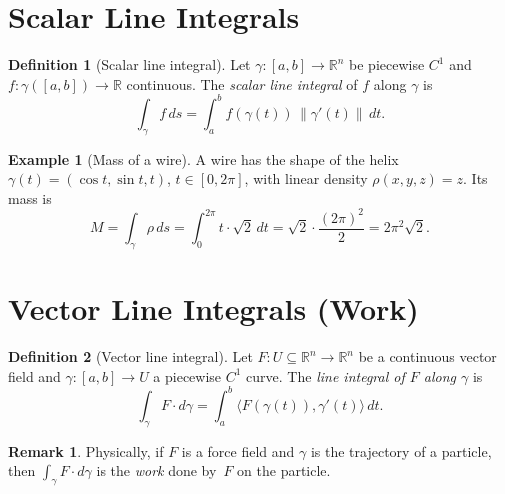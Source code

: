 \documentclass[12pt,a4paper]{book}
\theoremstyle{definition}
\newtheorem{definition}{Definition}[chapter]
\newtheorem{remark}{Remark}[chapter]
\newtheorem{example}{Example}[chapter]
\begin{document}
\section{Scalar Line Integrals}
\label{sec:scalar-line-integral}

\begin{definition}[Scalar line integral]\label{def:scalar-line-integral}
Let $\gamma\colon[a,b]\to\mathbb{R}^n$ be piecewise $C^1$ and
$f\colon\gamma([a,b])\to\mathbb{R}$ continuous.  The \emph{scalar line
integral} of $f$ along $\gamma$ is
\[
  \int_\gamma f\,ds = \int_a^b f(\gamma(t))\,\|\gamma'(t)\|\,dt.
\]
\end{definition}

\begin{example}[Mass of a wire]
\label{ex:mass-wire}
A wire has the shape of the helix $\gamma(t)=(\cos t,\sin t,t)$,
$t\in[0,2\pi]$, with linear density $\rho(x,y,z)=z$.  Its mass is
\[
  M = \int_\gamma \rho\,ds
  = \int_0^{2\pi}t\cdot\sqrt{2}\,dt
  = \sqrt{2}\cdot\frac{(2\pi)^2}{2}
  = 2\pi^2\sqrt{2}.
\]
\end{example}

\section{Vector Line Integrals (Work)}
\label{sec:vector-line-integral}

\begin{definition}[Vector line integral]\label{def:vector-line-integral}
Let $F\colon U\subseteq\mathbb{R}^n\to\mathbb{R}^n$ be a continuous vector
field and $\gamma\colon[a,b]\to U$ a piecewise $C^1$ curve.  The
\emph{line integral of $F$ along $\gamma$} is
\[
  \int_\gamma F\cdot d\gamma
  = \int_a^b \langle F(\gamma(t)),\gamma'(t)\rangle\,dt.
\]
\end{definition}

\begin{remark}
Physically, if $F$ is a force field and $\gamma$ is the trajectory of a
particle, then $\int_\gamma F\cdot d\gamma$ is the \emph{work} done by~$F$
on the particle.
\end{remark}
\end{document}
